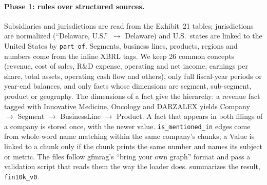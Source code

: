 \documentclass[10pt,twocolumn,letterpaper]{article}
\begin{document}
\paragraph{Phase 1: rules over structured sources.}
Subsidiaries and jurisdictions are read from the Exhibit~21 tables; jurisdictions are normalized
(\eg ``Delaware, U.S.''~$\rightarrow$ Delaware) and U.S.\ states are linked to the United States by
\texttt{part\_of}. Segments, business lines, products, regions and numbers come from the inline XBRL
tags. We keep 26 common concepts (revenue, cost of sales, R\&D expense, operating and net income,
earnings per share, total assets, operating cash flow and others), only full fiscal-year periods or
year-end balances, and only facts whose dimensions are segment, sub-segment, product or geography.
The dimensions of a fact give the hierarchy: a revenue fact tagged with Innovative Medicine, Oncology
and DARZALEX yields Company $\rightarrow$ Segment $\rightarrow$ BusinessLine $\rightarrow$ Product.
A fact that appears in both filings of a company is stored once, with the newer value.
\texttt{is\_mentioned\_in} edges come from whole-word name matching within the same company's
chunks; a Value is linked to a chunk only if the chunk prints the same number and names its subject
or metric. The files follow gfmrag's ``bring your own graph'' format and pass a validation script
that reads them the way the loader does.  summarizes the result, \texttt{fin10k\_v0}.
\end{document}
